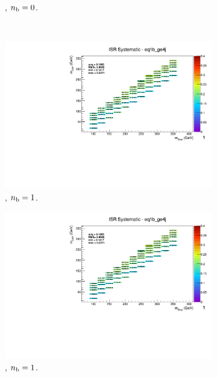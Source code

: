 \begin{figure}[ht!]
\begin{subfigure}[b]{0.32\textwidth}
    \caption{\njhigh, $n_{\text{b}} = 0$.}
  \end{subfigure}\\
  \begin{subfigure}[b]{0.32\textwidth}
    \includegraphics[width=\textwidth, page=14]{Figs/sms/t2cc/v37_3/systs/T2cc_ISR_eq1b_ge4j.pdf}
    \caption{\njhigh, $n_{\text{b}} = 1$.}
  \end{subfigure}
  \begin{subfigure}[b]{0.32\textwidth}
    \includegraphics[width=\textwidth, page=9]{Figs/sms/t2cc/v37_3/systs/T2cc_ISR_eq1b_ge4j.pdf}
    \caption{\njhigh, $n_{\text{b}} = 1$.}
  \end{subfigure}
  \begin{subfigure}[b]{0.32\textwidth}

\end{subfigure}
\end{figure}
